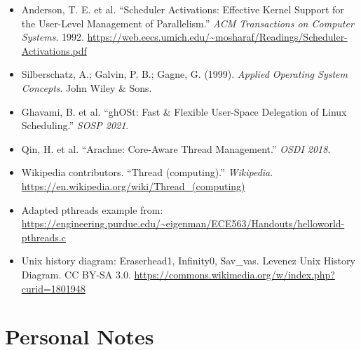 \documentclass[11pt]{article}
\begin{document}
\begin{itemize}
    \item Anderson, T. E. et al. ``Scheduler Activations: Effective Kernel Support for the User-Level Management of Parallelism.'' \textit{ACM Transactions on Computer Systems}. 1992. \url{https://web.eecs.umich.edu/~mosharaf/Readings/Scheduler-Activations.pdf}
    \item Silberschatz, A.; Galvin, P. B.; Gagne, G. (1999). \textit{Applied Operating System Concepts}. John Wiley \& Sons.
    \item Ghavami, B. et al. ``ghOSt: Fast \& Flexible User-Space Delegation of Linux Scheduling.'' \textit{SOSP 2021}.
    \item Qin, H. et al. ``Arachne: Core-Aware Thread Management.'' \textit{OSDI 2018}.
    \item Wikipedia contributors. ``Thread (computing).'' \textit{Wikipedia}. \url{https://en.wikipedia.org/wiki/Thread_(computing)}
    \item Adapted pthreads example from: \url{https://engineering.purdue.edu/~eigenman/ECE563/Handouts/helloworld-pthreads.c}
    \item Unix history diagram: Eraserhead1, Infinity0, Sav\_vas. Levenez Unix History Diagram. CC BY-SA 3.0. \url{https://commons.wikimedia.org/w/index.php?curid=1801948}
\end{itemize}

\section*{Personal Notes}
\end{document}
